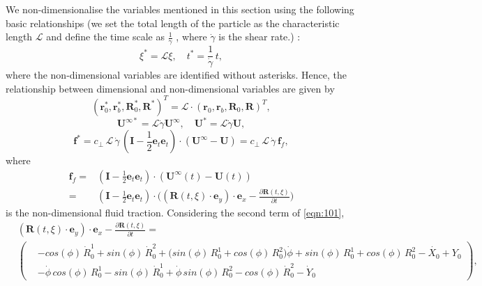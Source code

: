 \documentclass[a4paper,12pt]{article}
\begin{document}
We non-dimensionalise the variables mentioned in this section using the following basic relationships (we set the total length
of the particle as the characteristic length $\mathcal{L}$ and define the time scale as $\frac{1}{\dot{\gamma}}$ , where $\dot{\gamma}$ is the shear rate.) :
\begin{equation}
	\label{eqn:25}
	\xi^*=\mathcal{L}\xi, \quad t^*=\frac{1}{\dot{\gamma}}\,t,
\end{equation}
where the non-dimensional variables are identified without asterisks.
Hence, the relationship between dimensional and non-dimensional variables are given by
\begin{equation}
	\label{eqn:26}
	(\mathbf{r}_0^*, \mathbf{r}_b^*, \mathbf{R}_0^*, \mathbf{R}^*)^T=\mathcal{L}\cdot(\mathbf{r}_0, \mathbf{r}_b, \mathbf{R}_0, \mathbf{R})^T,
\end{equation}
\begin{equation}
	\label{eqn:27}
	\mathbf{U}^{\infty*}=\mathcal{L}\dot{\gamma}\mathbf{U}^{\infty}, \quad \mathbf{U}^*=\mathcal{L}\dot{\gamma}\mathbf{U},
\end{equation}
\begin{equation}
	\label{eqn:28}
	\mathbf{f}^*=c_\perp\,\mathcal{L}\,\dot{\gamma}\,\left(\mathbf{I}-\frac{1}{2}\mathbf{e}_t\mathbf{e}_t\right)\cdot(\mathbf{U}^{\infty}-\mathbf{U})=c_\perp\,\mathcal{L}\,\dot{\gamma}\,\mathbf{f}_{f},
\end{equation}
where 
\begin{equation}
	\label{eqn:101}
	\begin{aligned}
	\mathbf{f}_f=&\left(\mathbf{I}-\frac{1}{2}\mathbf{e}_t\mathbf{e}_t\right)\cdot(\mathbf{U}^{\infty}(t)-\mathbf{U}(t))\\
	=&\left(\mathbf{I}-\frac{1}{2}\mathbf{e}_t\mathbf{e}_t\right)\cdot\Big((\bm{\bm{R}}(t,\xi)\cdot\textbf{e}_y)\cdot\textbf{e}_x-\frac{\partial\textbf{R}(t,\xi)}{\partial t}\Big)
	\end{aligned}
\end{equation}
is the non-dimensional fluid traction. Considering the second term of \eqref{eqn:101},
\begin{equation}
	\label{eqn:120}
	\begin{aligned}
	&(\bm{R}(t,\xi)\cdot\textbf{e}_y)\cdot\textbf{e}_x-\frac{\partial\textbf{R}(t,\xi)}{\partial t}=\\
	&\left(
	\begin{aligned}	
		&-cos(\phi)\,\dot{R}_0^1+sin(\phi)\,\dot{R}_0^2+\Big(sin(\phi)\,R_0^1+cos(\phi)\,R_0^2\Big)\dot{\phi}+sin(\phi)\,R_0^1+cos(\phi)\,R_0^2-\dot{X_0}+Y_0\\
		&-\dot{\phi}\,cos(\phi)\,R_0^1-sin(\phi)\,\dot{R}_0^1+\dot{\phi}\,sin(\phi)\,R_0^2-cos(\phi)\,\dot{R}_0^2-\dot{Y}_0
	\end{aligned}\right),
\end{aligned}
\end{equation}
\end{document}
